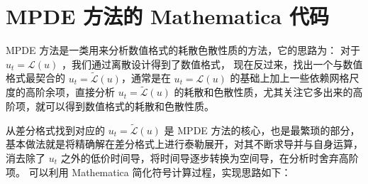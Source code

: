 \section{MPDE 方法的 Mathematica 代码}

MPDE 方法是一类用来分析数值格式的耗散色散性质的方法，它的思路为：
对于 $u_t = \mathcal{L}(u)$ ，我们通过离散设计得到了数值格式，
现在反过来，找出一个与数值格式最契合的 $u_t = \widetilde{\mathcal{L}}(u)$，通常是在 $u_t = \mathcal{L}(u)$ 的基础上加上一些依赖网格尺度的高阶余项，直接分析 $u_t = \widetilde{\mathcal{L}}(u)$ 的耗散和色散性质，尤其关注它多出来的高阶项，就可以得到数值格式的耗散和色散性质。

从差分格式找到对应的 $u_t = \widetilde{\mathcal{L}}(u)$ 是 MPDE 方法的核心，也是最繁琐的部分，基本做法就是将精确解在差分格式上进行泰勒展开，对其不断求导并与自身运算，消去除了 $u_t$ 之外的低价时间导，将时间导逐步转换为空间导，在分析时舍弃高阶项。
可以利用 Mathematica 简化符号计算过程，实现思路如下：

